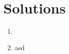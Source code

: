 \documentclass{article}
\begin{document}

\section*{Solutions}
\begin{enumerate}
    \item 
        
        \item asd
\end{enumerate}
\end{document}
